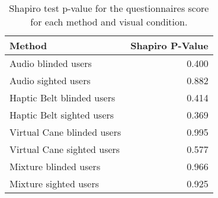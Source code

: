 
\begin{table}[!htb]
\centering
\caption{Shapiro test p-value for the questionnaires score for each method and visual condition.}
\label{tab:shapiro_questionnaires}
\begin{tabular}{lr}
\toprule
                    Method &  Shapiro P-Value \\
\midrule
       Audio blinded users &            0.400 \\
       Audio sighted users &            0.882 \\
 Haptic Belt blinded users &            0.414 \\
 Haptic Belt sighted users &            0.369 \\
Virtual Cane blinded users &            0.995 \\
Virtual Cane sighted users &            0.577 \\
     Mixture blinded users &            0.966 \\
     Mixture sighted users &            0.925 \\
\bottomrule
\end{tabular}
\end{table}

